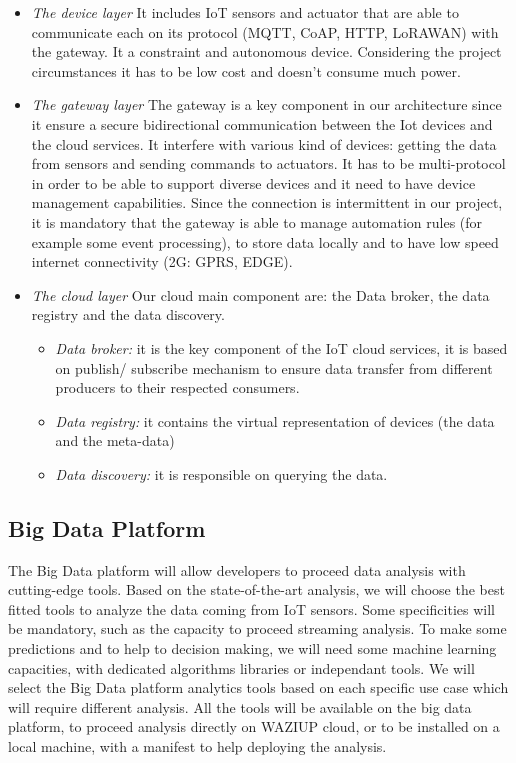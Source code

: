 \begin{itemize}
  \item \emph{The device layer}
    It includes IoT sensors and actuator that are able to communicate each on its protocol (MQTT, CoAP, HTTP, LoRAWAN) with the gateway. 
It a constraint and autonomous device. 
Considering the project circumstances it has to be low cost and doesn’t consume much power.
  \item \emph{The gateway layer}
  The gateway is a key component in our architecture since it ensure a secure bidirectional communication between the Iot devices and the cloud services.
 It interfere with various kind of devices: getting the data from sensors and sending commands to actuators.
  It has to be multi-protocol in order to be able to support diverse devices and it need to have device management capabilities.
Since the connection is intermittent in our project, it is mandatory that the gateway is able to manage automation rules (for example some event processing), to store data locally and to have low speed internet connectivity (2G: GPRS, EDGE).
  \item \emph{The cloud layer}
  Our cloud main component are: the Data broker, the data registry and the data discovery.
\begin{itemize}
  \item \emph{Data broker:}
    it is the key component of the IoT cloud services, it is based on publish/ subscribe mechanism to ensure data transfer from different producers to their respected consumers.
  \item \emph{Data registry:}
    it contains the virtual representation of devices (the data and the meta-data)
  \item \emph{Data discovery:} 
    it is responsible on querying the data.
\end{itemize}
\end{itemize}

\subsection{Big Data Platform}

The Big Data platform will allow developers to proceed data analysis with cutting-edge tools. 
Based on the state-of-the-art analysis, we will choose the best fitted tools to analyze the data coming from IoT sensors. 
Some specificities will be mandatory, such as the capacity to proceed streaming analysis. 
To make some predictions and to help to decision making, we will need some machine learning capacities, with dedicated algorithms libraries or independant tools.
We will select the Big Data platform analytics tools based on each specific use case which will require different analysis. 
All the tools will be available on the big data platform, to proceed analysis directly on WAZIUP cloud, or to be installed on a local machine, with a manifest to help deploying the analysis.




